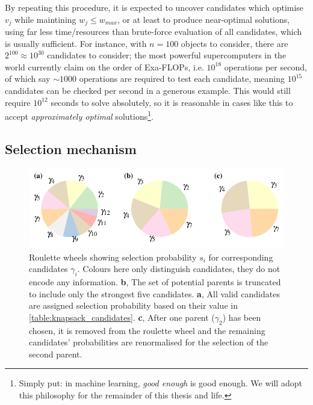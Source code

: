 By repeating this procedure, it is expected to uncover candidates which optimise $v_j$ while maintining $w_j \leq w_{max}$, 
    or at least to produce near-optimal solutions, using far less time/resources than brute-force evaluation of all candidates, 
    which is usually sufficient. 
For instance, with $n=100$ objects to consider, there are $2^{100} \approx 10^{30}$ candidates to consider; 
    the most powerful supercomputers in the world currently claim on the order of Exa-FLOPs, 
    i.e. $10^{18}$ operations per second, of which say $\sim1000$ operations are required to test each candidate, 
    meaning $10^{15}$ candidates can be checked per second in a generous example. 
This would still require $10^{12}$ seconds to solve absolutely, 
    so it is reasonable in cases like this to accept 
    \emph{approximately optimal} solutions\footnote{
        Simply put: in machine learning, \emph{good enough} is good enough.
        We will adopt this philosophy for the remainder of this thesis and life. 
    }. 


\subsection{Selection mechanism}
\begin{figure}
    \begin{center}
        \includegraphics{theoretical_study/figures/knapsack_roulette.pdf}
    \end{center}
    \caption[Roulette wheels for selection]{
        Roulette wheels showing selection probability $s_i$ for corresponding candidates $\gamma_i$. 
        Colours here only distinguish candidates, they do not encode any information. 
        \textbf{b}, The set of potential parents is truncated to include only the strongest five candidates. 
        \textbf{a}, All valid candidates are assigned selection probability based on their value in \cref{table:knapsack_candidates}. 
        \textbf{c}, After one parent ($\gamma_2$) has been chosen, it is removed from the roulette wheel and the remaining
         candidates' probabilities are renormalised for the selection of the second parent. 
    }
    \label{fig:knapsack_roulette}
\end{figure}

